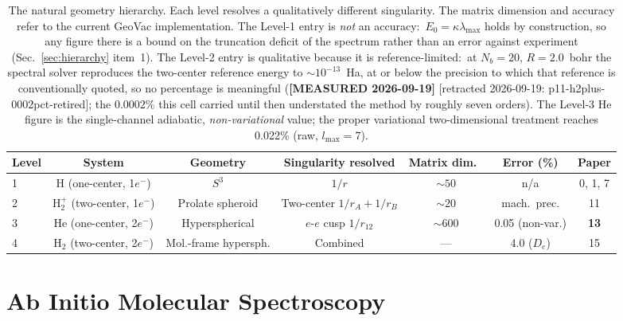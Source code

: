 \documentclass[aps,pra,twocolumn,superscriptaddress,longbibliography]{revtex4-2}
\begin{document}
\begin{table}[t]
\caption{The natural geometry hierarchy.  Each level resolves a
qualitatively different singularity.  The matrix dimension and
accuracy refer to the current GeoVac implementation.  The Level-1 entry
is \emph{not} an accuracy:\ $E_0 = \kappa\lambda_{\max}$ holds by
construction, so any figure there is a bound on the truncation deficit
of the spectrum rather than an error against experiment
(Sec.~\ref{sec:hierarchy} item~1).  The Level-2 entry is qualitative
because it is reference-limited:\ at $N_b = 20$, $R = 2.0$~bohr the
spectral solver reproduces the two-center reference energy to
$\sim\!10^{-13}$~Ha, at or below the precision to which that reference
is conventionally quoted, so no percentage is meaningful
(\textbf{[MEASURED 2026-09-19]}
[retracted 2026-09-19: p11-h2plus-0002pct-retired]; the $0.0002\%$ this
cell carried until then understated the method by roughly seven orders).  The Level-3 He
figure is the single-channel adiabatic, \emph{non-variational} value;
the proper variational two-dimensional treatment reaches 0.022\% (raw,
$l_{\max}=7$).}
\label{tab:hierarchy}
\begin{ruledtabular}
\begin{tabular}{lcccccc}
  Level & System & Geometry & Singularity resolved & Matrix dim.\
  & Error (\%) & Paper \\
  \hline
  1 & H (one-center, 1$e^-$) & $S^3$ & $1/r$ &
    $\sim\!50$ & n/a & 0, 1, 7 \\
  2 & H$_2^+$ (two-center, 1$e^-$) & Prolate spheroid & Two-center
    $1/r_A + 1/r_B$ & $\sim\!20$ & mach.\ prec. & 11 \\
  3 & He (one-center, 2$e^-$) & Hyperspherical & $e$-$e$ cusp
    $1/r_{12}$ & $\sim\!600$ & 0.05 (non-var.) & \textbf{13} \\
  4 & H$_2$ (two-center, 2$e^-$) & Mol.-frame hypersph. & Combined &
    --- & 4.0 ($D_e$) & 15 \\
\end{tabular}
\end{ruledtabular}
\end{table}


\section{Ab Initio Molecular Spectroscopy}
\label{sec:spectroscopy}
\end{document}
